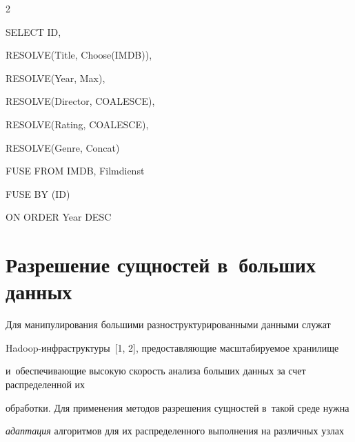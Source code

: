 \begin{multicols}{2}
\noindent

{\sf SELECT ID,}



\noindent

{\sf  \hspace*{3pt}RESOLVE(Title, Choose(IMDB)),}



\noindent

{\sf   \hspace*{3pt}RESOLVE(Year, Max),}



\noindent

{\sf  \hspace*{3pt}RESOLVE(Director, COALESCE),}



\noindent

{\sf   \hspace*{3pt}RESOLVE(Rating, COALESCE),}



\noindent

{\sf   \hspace*{3pt}RESOLVE(Genre, Concat)}



\noindent

{\sf   FUSE FROM IMDB, Filmdienst}



\noindent

{\sf   FUSE BY (ID)}



\noindent

{\sf   ON ORDER Year DESC}



  \section{Разрешение сущностей в~больших данных}



  Для манипулирования большими разноструктурированными данными служат

  Hadoop-инф\-ра\-струк\-ту\-ры~[1, 2], предоставляющие масштабируемое хранилище

и~обеспечивающие высокую \mbox{скорость} анализа больших данных за счет распределенной их

обработки. Для применения методов разрешения сущностей в~такой среде нужна

\textit{адаптация} алгоритмов для их распределенного выполнения на различных узлах


\end{multicols}
